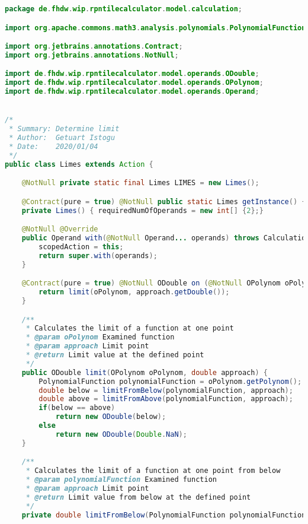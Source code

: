 \begin{lstlisting}[caption=Limes (Istogu),label=list:Limes,language=Java]
package de.fhdw.wip.rpntilecalculator.model.calculation;

import org.apache.commons.math3.analysis.polynomials.PolynomialFunction;

import org.jetbrains.annotations.Contract;
import org.jetbrains.annotations.NotNull;

import de.fhdw.wip.rpntilecalculator.model.operands.ODouble;
import de.fhdw.wip.rpntilecalculator.model.operands.OPolynom;
import de.fhdw.wip.rpntilecalculator.model.operands.Operand;


/*
 * Summary: Determine limit
 * Author:  Getuart Istogu
 * Date:    2020/01/04
 */
public class Limes extends Action {

    @NotNull private static final Limes LIMES = new Limes();

    @Contract(pure = true) @NotNull public static Limes getInstance() { return LIMES; }
    private Limes() { requiredNumOfOperands = new int[] {2};}

    @NotNull @Override
    public Operand with(@NotNull Operand... operands) throws CalculationException {
        scopedAction = this;
        return super.with(operands);
    }

    @Contract(pure = true) @NotNull ODouble on (@NotNull OPolynom oPolynom, @NotNull ODouble approach) {
        return limit(oPolynom, approach.getDouble());
    }

    /**
     * Calculates the limit of a function at one point
     * @param oPolynom Examined function
     * @param approach Limit point
     * @return Limit value at the defined point
     */
    public ODouble limit(OPolynom oPolynom, double approach) {
        PolynomialFunction polynomialFunction = oPolynom.getPolynom();
        double below = limitFromBelow(polynomialFunction, approach);
        double above = limitFromAbove(polynomialFunction, approach);
        if(below == above)
            return new ODouble(below);
        else
            return new ODouble(Double.NaN);
    }

    /**
     * Calculates the limit of a function at one point from below
     * @param polynomialFunction Examined function
     * @param approach Limit point
     * @return Limit value from below at the defined point
     */
    private double limitFromBelow(PolynomialFunction polynomialFunction, double approach) {


\end{lstlisting}

